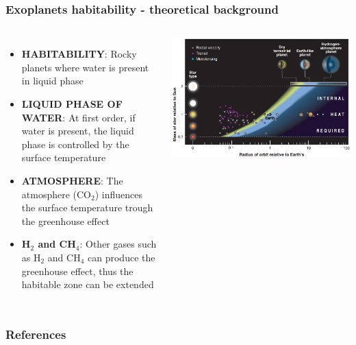 \documentclass[compress]{beamer}
\begin{document}
\begin{frame}
\frametitle{Exoplanets habitability - theoretical background}
\begin{columns}
\begin{itemize}

\item\textbf{HABITABILITY}: Rocky planets where water is present in liquid phase 
\item\textbf{LIQUID PHASE OF WATER}: At first order, if water is present, the liquid phase is controlled by the surface temperature 
\item\textbf{ATMOSPHERE}: The atmosphere (CO$_{2}$) influences the surface temperature trough the greenhouse effect
\item\textbf{H$_{2}$ and CH$_{4}$}: Other gases such as H$_{2}$ and CH$_{4}$ can produce the greenhouse effect, thus the habitable zone can be extended 
\end{itemize}
\begin{minipage}{\textwidth}
  \centering
  \includegraphics[width=\linewidth,]{Pic/Planets_habitability_Seager.png}
\end{minipage}%

\end{columns}
\end{frame}





\begin{frame}[t,allowframebreaks]
\frametitle{References}
\printbibliography
\end{frame}
\end{document}
